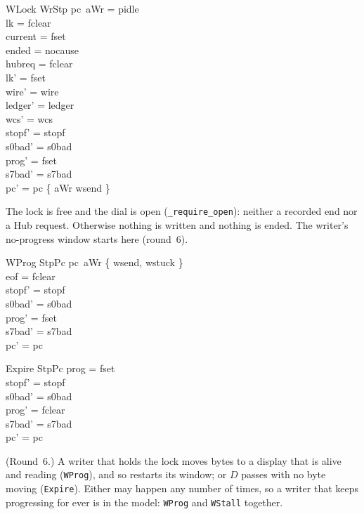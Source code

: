 \documentclass[a4paper,10pt,fleqn]{article}
\begin{document}
\begin{schema}{WLock}
  WrStp
\where
  pc~aWr = pidle \\
  lk = fclear \\
  current = fset \\
  ended = nocause \\
  hubreq = fclear \\
  lk' = fset \\
  wire' = wire \\
  ledger' = ledger \\
  wcs' = wcs \\
  stopf' = stopf \\
  s0bad' = s0bad \\
  prog' = fset \\
  s7bad' = s7bad \\
  pc' = pc \oplus \{ aWr \mapsto wsend \}
\end{schema}

The lock is free and the dial is open (\texttt{\_require\_open}): neither a
recorded end nor a Hub request.  Otherwise nothing is written and nothing is
ended.  The writer's no-progress window starts here (round~6).

\begin{schema}{WProg}
  StpPc
\where
  pc~aWr \in \{ wsend, wstuck \} \\
  eof = fclear \\
  stopf' = stopf \\
  s0bad' = s0bad \\
  prog' = fset \\
  s7bad' = s7bad \\
  pc' = pc
\end{schema}

\begin{schema}{Expire}
  StpPc
\where
  prog = fset \\
  stopf' = stopf \\
  s0bad' = s0bad \\
  prog' = fclear \\
  s7bad' = s7bad \\
  pc' = pc
\end{schema}

(Round~6.)  A writer that holds the lock moves bytes to a display that is
alive and reading (\texttt{WProg}), and so restarts its window; or $D$ passes
with no byte moving (\texttt{Expire}).  Either may happen any number of times, so
a writer that keeps progressing for ever is in the model: \texttt{WProg} and
\texttt{WStall} together.
\end{document}
